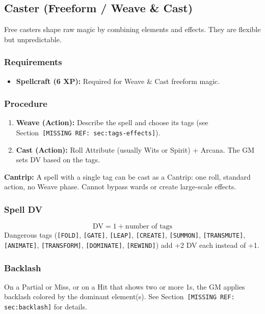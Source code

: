 \subsection{Caster (Freeform / Weave \& Cast)}

Free casters shape raw magic by combining elements and effects. They are flexible but unpredictable.

\subsubsection{Requirements}
\begin{itemize}
  \item \textbf{Spellcraft (6 XP):} Required for Weave \& Cast freeform magic.
\end{itemize}

\subsubsection{Procedure}
\begin{enumerate}
  \item \textbf{Weave (Action):} Describe the spell and choose its tags (see Section~\texttt{[MISSING REF: sec:tags-effects]}).
  \item \textbf{Cast (Action):} Roll Attribute (usually Wits or Spirit) + Arcana. The GM sets DV based on the tags.
\end{enumerate}

\textbf{Cantrip:} A spell with a single tag can be cast as a Cantrip: one roll, standard action, no Weave phase. Cannot bypass wards or create large-scale effects.

\subsubsection{Spell DV}
\[
\text{DV} = 1 + \text{number of tags}
\]
Dangerous tags (\texttt{[FOLD]}, \texttt{[GATE]}, \texttt{[LEAP]}, \texttt{[CREATE]}, \texttt{[SUMMON]}, \texttt{[TRANSMUTE]}, \texttt{[ANIMATE]}, \texttt{[TRANSFORM]}, \texttt{[DOMINATE]}, \texttt{[REWIND]}) add +2 DV each instead of +1.

\subsubsection{Backlash}
On a Partial or Miss, or on a Hit that shows two or more 1s, the GM applies backlash colored by the dominant element(s). See Section~\texttt{[MISSING REF: sec:backlash]} for details.


